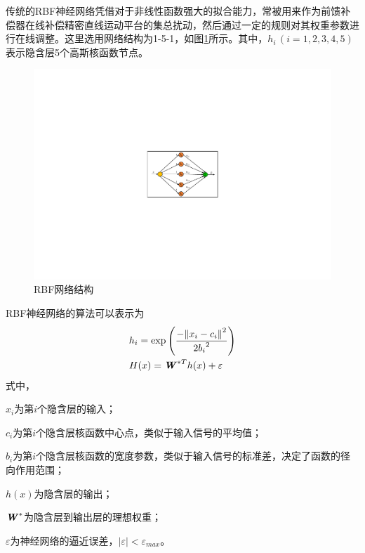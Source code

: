 传统的RBF神经网络凭借对于非线性函数强大的拟合能力\cite{1987Powell}，常被用来作为前馈补偿器在线补偿精密直线运动平台的集总扰动，然后通过一定的规则对其权重参数进行在线调整。这里选用网络结构为1-5-1，如图\ref{RBF网络结构}所示。其中，$h_i\,(i=1,2,3,4,5)$表示隐含层5个高斯核函数节点。
\\
\begin{figure}[H]
	\centering
	\includegraphics[width=12cm]{figures/RBF神经网络结构.pdf}
	\caption{RBF网络结构}
	\label{RBF网络结构}
\end{figure}

RBF神经网络的算法可以表示为
\begin{equation}
\begin{aligned}
&h_i=\text{exp}\left(\frac{-\norm{x_i-c_i}^2}{2{b_i}^2}\right)\\
&H(x)={\textbf{\textit{W}}^{*T}}h(x)+\varepsilon\\
\end{aligned}
\end{equation}
式中，

$x_i$为第$i$个隐含层的输入；

$c_i$为第$i$个隐含层核函数中心点，类似于输入信号的平均值；

$b_i$为第$i$个隐含层核函数的宽度参数，类似于输入信号的标准差，决定了函数的径向作用范围；

$h(x)$为隐含层的输出；

$\textbf{\textit{W}}^*$为隐含层到输出层的理想权重；

$\varepsilon$为神经网络的逼近误差，$\left|\varepsilon\right| <{{\varepsilon }_{max}}$。

